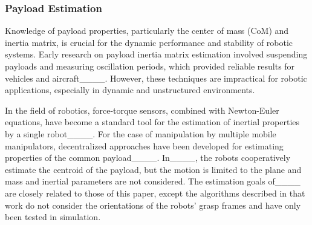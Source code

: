 \subsubsection{Payload Estimation}
Knowledge of payload properties, particularly the center of mass (CoM) and inertia matrix, is crucial for the dynamic performance and stability of robotic systems. Early research on payload inertia matrix estimation involved suspending payloads and measuring oscillation periods, which provided reliable results for vehicles and aircraft____. However, these techniques are impractical for robotic applications, especially in dynamic and unstructured environments.

In the field of robotics, force-torque sensors, combined with Newton-Euler equations, have become a standard tool for the estimation of inertial properties by a single robot____. For the case of manipulation by multiple mobile manipulators, decentralized approaches have been developed for estimating properties of the common payload____. %
In____, the robots cooperatively estimate the centroid of the payload, but the motion is limited to the plane and mass and inertial parameters are not considered. The estimation goals of____ are closely related to those of this paper, except the algorithms described in that work do not consider the orientations of the robots' grasp frames and have only been tested in simulation.



